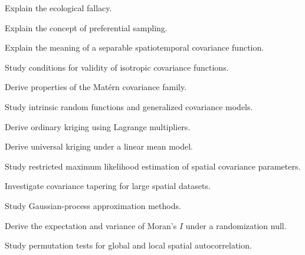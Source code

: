 \begin{exercise}[3]
Explain the ecological fallacy.
\end{exercise}

\begin{exercise}[3]
Explain the concept of preferential sampling.
\end{exercise}

\begin{exercise}[3]
Explain the meaning of a separable spatiotemporal covariance function.
\end{exercise}

\begin{exercise}[4]
Study conditions for validity of isotropic covariance functions.
\end{exercise}

\begin{exercise}[4]
Derive properties of the Matérn covariance family.
\end{exercise}

\begin{exercise}[4]
Study intrinsic random functions and generalized covariance models.
\end{exercise}

\begin{exercise}[4]
Derive ordinary kriging using Lagrange multipliers.
\end{exercise}

\begin{exercise}[4]
Derive universal kriging under a linear mean model.
\end{exercise}

\begin{exercise}[4]
Study restricted maximum likelihood estimation of spatial covariance
parameters.
\end{exercise}

\begin{exercise}[4]
Investigate covariance tapering for large spatial datasets.
\end{exercise}

\begin{exercise}[4]
Study Gaussian-process approximation methods.
\end{exercise}

\begin{exercise}[4]
Derive the expectation and variance of Moran's \(I\) under a randomization
null.
\end{exercise}

\begin{exercise}[4]
Study permutation tests for global and local spatial autocorrelation.
\end{exercise}

